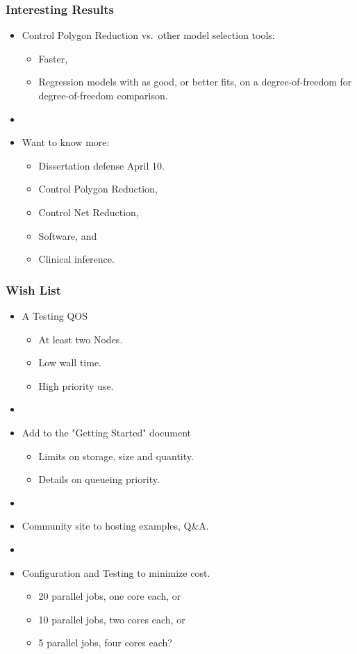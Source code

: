 \documentclass[10pt]{beamer}
\begin{document}
\begin{frame}
  \frametitle{Interesting Results}
  \begin{itemize}
    \item Control Polygon Reduction vs.\ other model selection tools:
      \begin{itemize}
        \item Faster,
        \item Regression models with as good, or better fits, on a
          degree-of-freedom for degree-of-freedom comparison.
      \end{itemize}
    \item[]
    \item Want to know more: 
      \begin{itemize}
        \item Dissertation defense April 10.
        \item Control Polygon Reduction,
        \item Control Net Reduction,
        \item Software, and
        \item Clinical inference.
      \end{itemize}
  \end{itemize} 
\end{frame}

\begin{frame}
  \frametitle{Wish List}
  \begin{itemize}
    \item A Testing QOS
      \begin{itemize}
        \item At least two Nodes.
        \item Low wall time.
        \item High priority use.
      \end{itemize}
    \item[]
    \item Add to the "Getting Started" document
      \begin{itemize}
        \item Limits on storage, size and quantity.
        \item Details on queueing priority.
      \end{itemize}
    \item[]
    \item Community site to hosting examples, Q\&A.
    \item[]
    \item Configuration and Testing to minimize cost.
      \begin{itemize}
        \item 20 parallel jobs, one core each, or
        \item 10 parallel jobs, two cores each, or
        \item 5 parallel jobs, four cores each?
      \end{itemize}
  \end{itemize}
\end{frame}
\end{document}
